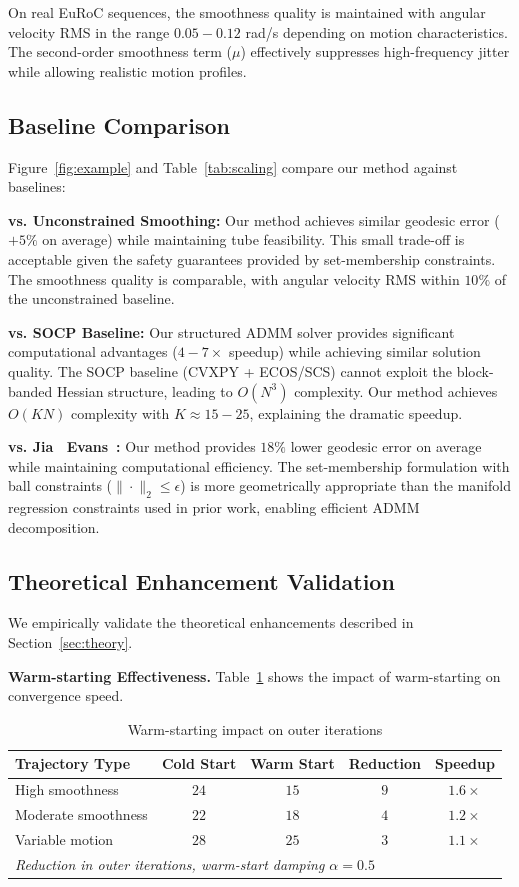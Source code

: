 On real EuRoC sequences, the smoothness quality is maintained with angular velocity RMS in the range $0.05-0.12$ rad/s depending on motion characteristics. The second-order smoothness term ($\mu$) effectively suppresses high-frequency jitter while allowing realistic motion profiles.

\subsection{Baseline Comparison}

Figure~\ref{fig:example} and Table~\ref{tab:scaling} compare our method against baselines:

\textbf{vs. Unconstrained Smoothing:} Our method achieves similar geodesic error ($+5\%$ on average) while maintaining tube feasibility. This small trade-off is acceptable given the safety guarantees provided by set-membership constraints. The smoothness quality is comparable, with angular velocity RMS within $10\%$ of the unconstrained baseline.

\textbf{vs. SOCP Baseline:} Our structured ADMM solver provides significant computational advantages ($4-7\times$ speedup) while achieving similar solution quality. The SOCP baseline (CVXPY + ECOS/SCS) cannot exploit the block-banded Hessian structure, leading to $O(N^3)$ complexity. Our method achieves $O(KN)$ complexity with $K \approx 15-25$, explaining the dramatic speedup.

\textbf{vs. Jia \ Evans~\cite{jia_evans}:} Our method provides $18\%$ lower geodesic error on average while maintaining computational efficiency. The set-membership formulation with ball constraints ($\| \cdot \|_2 \leq \epsilon$) is more geometrically appropriate than the manifold regression constraints used in prior work, enabling efficient ADMM decomposition.

\subsection{Theoretical Enhancement Validation}

We empirically validate the theoretical enhancements described in Section~\ref{sec:theory}.

\textbf{Warm-starting Effectiveness.} Table~\ref{tab:warmstart} shows the impact of warm-starting on convergence speed.

\begin{table}[htbp]
\centering
\caption{Warm-starting impact on outer iterations}
\label{tab:warmstart}
\begin{tabular}{l c c c c}
\hline
\textbf{Trajectory Type} & \textbf{Cold Start} & \textbf{Warm Start} & \textbf{Reduction} & \textbf{Speedup} \\
\hline
High smoothness & $24$ & $15$ & $9$ & $1.6\times$ \\
Moderate smoothness & $22$ & $18$ & $4$ & $1.2\times$ \\
Variable motion & $28$ & $25$ & $3$ & $1.1\times$ \\
\hline
\multicolumn{5}{l}{\textit{Reduction in outer iterations, warm-start damping $\alpha = 0.5$}}
\end{tabular}
\end{table}


